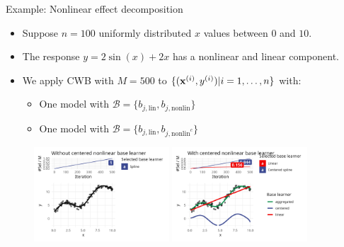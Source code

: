 \documentclass[11pt,compress,t,notes=noshow, xcolor=table]{beamer}
\begin{document}
\begin{vbframe}{Example: Nonlinear effect decomposition}

\begin{itemize}
    \item 
        Suppose $n = 100$ uniformly distributed $x$ values between $0$ and $10$.

    \item 
        The response $y = 2\sin(x) + 2x$ has a nonlinear and linear component.

    \item
        We apply CWB with $M = 500$ to $\{(\mathbf{x}^{(i)}, y^{(i)}) | i = 1, \dots, n\}$ with:
        \begin{itemize}
            \item One model with $\mathcal{B} = \{b_{j,\text{lin}}, b_{j,\text{nonlin}}\}$
            \item One model with $\mathcal{B} = \{b_{j,\text{lin}}, b_{j,\text{nonlin}^c}\}$
        \end{itemize}
\end{itemize}

\begin{figure}
    \centering
    \includegraphics[width=0.45\textwidth]{figure/fig-decomp1.png}
    \hfill\includegraphics[width=0.45\textwidth]{figure/fig-decomp2.png}
\end{figure}

\end{vbframe}


\end{document}
